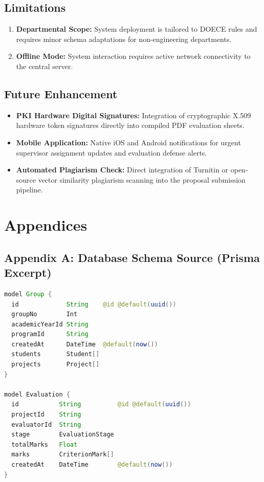 \documentclass[12pt]{report}
\begin{document}
\section{Limitations}
\begin{enumerate}
    \item \textbf{Departmental Scope:} System deployment is tailored to DOECE rules and requires minor schema adaptations for non-engineering departments.
    \item \textbf{Offline Mode:} System interaction requires active network connectivity to the central server.
\end{enumerate}

\section{Future Enhancement}
\begin{itemize}
    \item \textbf{PKI Hardware Digital Signatures:} Integration of cryptographic X.509 hardware token signatures directly into compiled PDF evaluation sheets.
    \item \textbf{Mobile Application:} Native iOS and Android notifications for urgent supervisor assignment updates and evaluation defense alerts.
    \item \textbf{Automated Plagiarism Check:} Direct integration of Turnitin or open-source vector similarity plagiarism scanning into the proposal submission pipeline.
\end{itemize}

\renewcommand{\bibname}{References}



\chapter*{Appendices}

\section*{Appendix A: Database Schema Source (Prisma Excerpt)}
\begin{lstlisting}[language=Java, caption={Prisma Data Model Excerpt}]
model Group {
  id             String    @id @default(uuid())
  groupNo        Int
  academicYearId String
  programId      String
  createdAt      DateTime  @default(now())
  students       Student[]
  projects       Project[]
}

model Evaluation {
  id           String          @id @default(uuid())
  projectId    String
  evaluatorId  String
  stage        EvaluationStage
  totalMarks   Float
  marks        CriterionMark[]
  createdAt    DateTime        @default(now())
}
\end{lstlisting}
\end{document}

